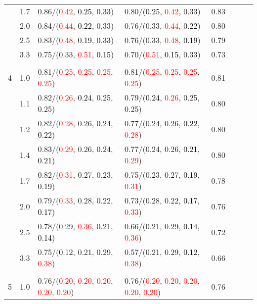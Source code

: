 \documentclass[10pt,a4paper]{report}
\begin{document}
\begin{table}[!htbp]
\begin{center}
{\begin{tabular}{ccllcccc}
			&1.7&0.86/(\textcolor{red}{0.42}, \textcolor{black}{0.25}, 0.33)&0.80/(\textcolor{black}{0.25}, \textcolor{red}{0.42}, 0.33)&0.83\\
			&2.0&0.84/(\textcolor{red}{0.44}, \textcolor{black}{0.22}, 0.33)&0.76/(0.33, \textcolor{red}{0.44}, \textcolor{black}{0.22})&0.80\\
			&2.5&0.83/(\textcolor{red}{0.48}, \textcolor{black}{0.19}, 0.33)&0.76/(0.33, \textcolor{red}{0.48}, \textcolor{black}{0.19})&0.79\\
			&3.3&0.75/(0.33, \textcolor{red}{0.51}, \textcolor{black}{0.15})&0.70/(\textcolor{red}{0.51}, \textcolor{black}{0.15}, 0.33)&0.73\\
			&&&&\\
			4			&1.0&0.81/(\textcolor{red}{0.25}, \textcolor{red}{0.25}, \textcolor{red}{0.25}, \textcolor{red}{0.25})&0.81/(\textcolor{red}{0.25}, \textcolor{red}{0.25}, \textcolor{red}{0.25}, \textcolor{red}{0.25})&0.81\\
			&1.1&0.82/(\textcolor{red}{0.26}, \textcolor{black}{0.24}, 0.25, 0.25)&0.79/(\textcolor{black}{0.24}, \textcolor{red}{0.26}, 0.25, 0.25)&0.80\\
			&1.2&0.82/(\textcolor{red}{0.28}, 0.26, 0.24, \textcolor{black}{0.22})&0.77/(0.24, 0.26, \textcolor{black}{0.22}, \textcolor{red}{0.28})&0.80\\
			&1.4&0.83/(\textcolor{red}{0.29}, 0.26, 0.24, \textcolor{black}{0.21})&0.77/(0.24, 0.26, \textcolor{black}{0.21}, \textcolor{red}{0.29})&0.80\\
			&1.7&0.82/(\textcolor{red}{0.31}, 0.27, 0.23, \textcolor{black}{0.19})&0.75/(0.23, 0.27, \textcolor{black}{0.19}, \textcolor{red}{0.31})&0.78\\
			&2.0&0.79/(\textcolor{red}{0.33}, 0.28, 0.22, \textcolor{black}{0.17})&0.73/(0.28, 0.22, \textcolor{black}{0.17}, \textcolor{red}{0.33})&0.76\\
			&2.5&0.78/(0.29, \textcolor{red}{0.36}, 0.21, \textcolor{black}{0.14})&0.66/(0.21, 0.29, \textcolor{black}{0.14}, \textcolor{red}{0.36})&0.72\\
			&3.3&0.75/(\textcolor{black}{0.12}, 0.21, 0.29, \textcolor{red}{0.38})&0.57/(0.21, 0.29, \textcolor{black}{0.12}, \textcolor{red}{0.38})&0.66\\
			&&&&\\
			5			&1.0&0.76/(\textcolor{red}{0.20}, \textcolor{red}{0.20}, \textcolor{red}{0.20}, \textcolor{red}{0.20}, \textcolor{red}{0.20})&0.76/(\textcolor{red}{0.20}, \textcolor{red}{0.20}, \textcolor{red}{0.20}, \textcolor{red}{0.20}, \textcolor{red}{0.20})&0.76\\

\end{tabular}}
\end{center}
\end{table}
\end{document}
